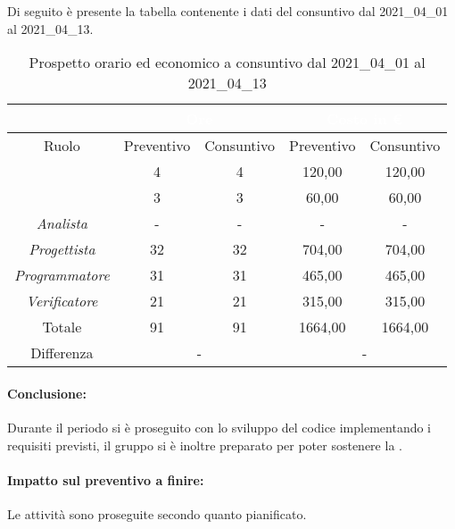 Di seguito è presente la tabella contenente i dati del consuntivo dal 2021\_04\_01 al 2021\_04\_13.
\begin{table}[H]
	\centering
	\begin{tabular}{|c|c|c|c|c|}
		\rowcolor{darkblue} 
		&\multicolumn{2}{c|}{\textcolor{white}{Ore}}&\multicolumn{2}{c|}{\textcolor{white}{Costo in €}}\\ \hline
		Ruolo			&	Preventivo				&	Consuntivo		&	Preventivo	&	Consuntivo\\ \hline
		{\Responsabile}		&	4					&	4				&	120,00			&	120,00 \\ \hline
		{\Amministratore}	&	3					&	3				&	60,00			&	60,00 \\ \hline
		\textit{Analista}	&	-					&	-				&	-			&	- \\ \hline
		\textit{Progettista}& 	32					&   32 				& 	704,00			&  	704,00 \\ \hline
		\textit{Programmatore}& 31					& 	31				& 	465,00			&  	465,00 \\ \hline
		\textit{Verificatore}&	21					&	21				&	315,00			&	315,00 \\ \hline
		Totale				&	91					&	91				&	1664,00			&	1664,00 \\ \hline
		Differenza			& 	\multicolumn{2}{c|}{-} 				&\multicolumn{2}{c|}{-}\\ \hline
	\end{tabular}
	\caption{Prospetto orario ed economico a consuntivo dal 2021\_04\_01 al 2021\_04\_13}
\end{table}
\paragraph*{Conclusione:}
Durante il periodo si è proseguito con lo sviluppo del codice implementando i requisiti previsti, il gruppo si è inoltre preparato per poter sostenere la .
\paragraph*{Impatto sul preventivo a finire:}
Le attività sono proseguite secondo quanto pianificato.

